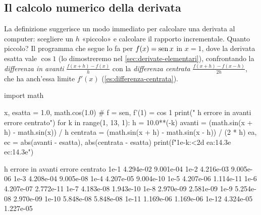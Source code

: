 \subsection{Il calcolo numerico della derivata}

La definizione suggerisce un modo immediato per calcolare una derivata al computer:
scegliere un $h$ «piccolo» e calcolare il rapporto incrementale. Quanto piccolo? Il
programma che segue lo fa per $f(x)=\operatorname{sen} x$ in $x=1$, dove la derivata esatta vale
$\cos1$ (lo dimostreremo nel \cref{sec:derivate-elementari}), confrontando la
\emph{differenza in avanti} $\frac{f(x+h)-f(x)}{h}$ con la \emph{differenza centrata}
$\frac{f(x+h)-f(x-h)}{2h}$, che ha anch'essa limite $f'(x)$ (\cref{es:differenza-centrata}).

\begin{python}[Derivata numerica di $\sen x$ in $x=1$]
import math

x, esatta = 1.0, math.cos(1.0)        # f = sen, f'(1) = cos 1
print("   h       errore in avanti   errore centrato")
for k in range(1, 13, 1):
    h = 10.0**(-k)
    avanti = (math.sin(x + h) - math.sin(x)) / h
    centrata = (math.sin(x + h) - math.sin(x - h)) / (2 * h)
    ea, ec = abs(avanti - esatta), abs(centrata - esatta)
    print(f"1e-{k:<2d}   {ea:14.3e}   {ec:14.3e}")
\end{python}
\begin{risultato}
   h       errore in avanti   errore centrato
1e-1         4.294e-02        9.001e-04
1e-2         4.216e-03        9.005e-06
1e-3         4.208e-04        9.005e-08
1e-4         4.207e-05        9.004e-10
1e-5         4.207e-06        1.114e-11
1e-6         4.207e-07        2.772e-11
1e-7         4.183e-08        1.943e-10
1e-8         2.970e-09        2.581e-09
1e-9         5.254e-08        2.970e-09
1e-10        5.848e-08        5.848e-08
1e-11        1.169e-06        1.169e-06
1e-12        4.324e-05        1.227e-05
\end{risultato}

